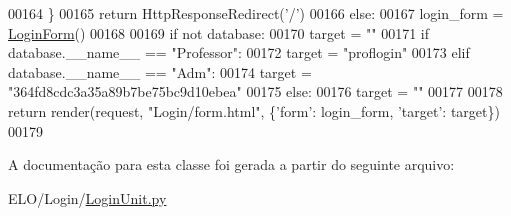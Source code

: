 \begin{DoxyCode}
00164                             \}
00165                 \textcolor{keywordflow}{return} HttpResponseRedirect(\textcolor{stringliteral}{'/'})
00166         \textcolor{keywordflow}{else}:
00167             login\_form = \hyperlink{classLogin_1_1forms_1_1LoginForm}{LoginForm}()
00168 
00169             \textcolor{keywordflow}{if} \textcolor{keywordflow}{not} database:
00170                 target = \textcolor{stringliteral}{""}
00171             \textcolor{keywordflow}{if} database.\_\_name\_\_ == \textcolor{stringliteral}{"Professor"}:
00172                 target = \textcolor{stringliteral}{"proflogin"}
00173             \textcolor{keywordflow}{elif} database.\_\_name\_\_ == \textcolor{stringliteral}{"Adm"}:
00174                 target = \textcolor{stringliteral}{"364fd8cdc3a35a89b7be75bc9d10ebea"}
00175             \textcolor{keywordflow}{else}:
00176                 target = \textcolor{stringliteral}{""}
00177 
00178             \textcolor{keywordflow}{return} render(request, \textcolor{stringliteral}{"Login/form.html"}, \{\textcolor{stringliteral}{'form'}: login\_form, \textcolor{stringliteral}{'target'}: target\})
00179 

\end{DoxyCode}


A documentação para esta classe foi gerada a partir do seguinte arquivo\-:\begin{DoxyCompactItemize}
\item 
E\-L\-O/\-Login/\hyperlink{LoginUnit_8py}{Login\-Unit.\-py}\end{DoxyCompactItemize}
